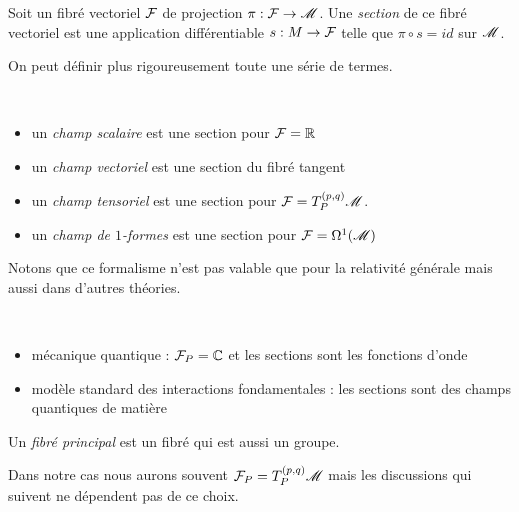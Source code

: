 \documentclass[a4paper,11pt]{report}
\begin{document}
                \begin{defn}
                    Soit un fibré vectoriel $\mathcal{F}$ de projection $\pi:\mathcal{F}\to\mathscr{M}$. Une \textit{section} de ce fibré vectoriel est une application différentiable $s:M\to\mathcal{F}$ telle que $\pi\circ s = id$ sur $\mathscr{M}$.
                \end{defn}
                
                On peut définir plus rigoureusement toute une série de termes.
                \begin{defn}${}$
                    \begin{itemize}[label = \textbullet]
                        \item un \textit{champ scalaire} est une section pour $\mathcal{F} = \mathbb{R}$
                        \item un \textit{champ vectoriel} est une section du fibré tangent
                        \item un \textit{champ tensoriel} est une section pour $\mathcal{F} = T_P^{(p,q)}\mathscr{M}$.
                        \item un \textit{champ de $1$-formes} est une section pour $\mathcal{F} = \Omega^1(\mathscr{M})$
                    \end{itemize}
                \end{defn}
                
                Notons que ce formalisme n'est pas valable que pour la relativité générale mais aussi dans d'autres théories.
                
                \begin{exmp}${}$
                    \begin{itemize}[label = \textbullet]
                        \item mécanique quantique : $\mathcal{F}_P = \mathbb{C}$ et les sections sont les fonctions d'onde
                        \item modèle standard des interactions fondamentales : les sections sont des champs quantiques de matière
                    \end{itemize}
                \end{exmp}
                
                \begin{defn}
                    Un \textit{fibré principal} est un fibré qui est aussi un groupe.
                \end{defn}
                
                Dans notre cas nous aurons souvent $\mathcal{F}_P = T_P^{(p,q)}\mathscr{M}$ mais les discussions qui suivent ne dépendent pas de ce choix.\\
                
\end{document}
